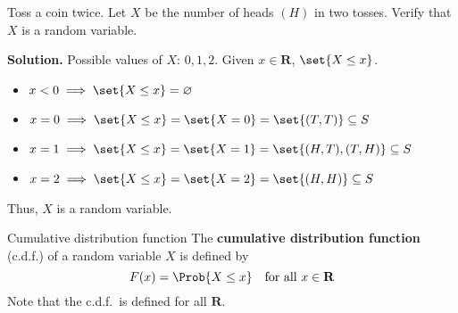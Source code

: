 \begin{Example}{}{}
    Toss a coin twice. Let $ X $ be the number of heads $ (H) $ in two tosses.
    Verify that $ X $ is a random variable.

    \textbf{Solution.}
    Possible values of $ X $: $ 0,1,2 $. Given $ x\in\mathbf{R} $,
    $ \set{X\le x} $.
    \begin{itemize}
        \item $ x<0 \implies \set{X\le x}=\varnothing $
        \item $ x=0 \implies \set{X\le x}=\set{X=0}=\set{(T,T)}\subseteq S$
        \item $ x=1 \implies \set{X\le x}=\set{X=1}=\set{(H,T),(T,H)}
                  \subseteq S $
        \item $ x=2 \implies \set{X\le x}=\set{X=2}=
                  \set{(H,H)}\subseteq S $
    \end{itemize}
    Thus, $ X $ is a random variable.
\end{Example}

\begin{Definition}{Cumulative distribution function}{}
    The \textbf{cumulative distribution function} (c.d.f.) of a random variable
    $ X $ is defined by
    \[ F(x)=\Prob{X\le x}\quad\text{for all $ x\in\mathbf{R} $} \]
    Note that the c.d.f.\ is defined for all $ \mathbf{R} $.
\end{Definition}

